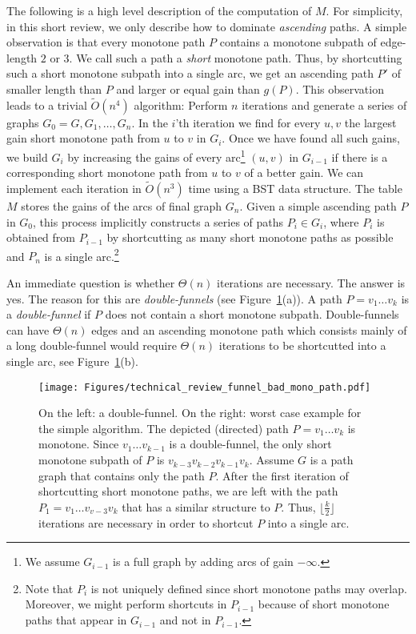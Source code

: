 \documentclass[11pt]{article}
\begin{document}
The following is a high level description of the computation of $M$. For simplicity, in this short review, we only describe how to dominate \emph{ascending} paths. A simple observation is that every monotone path $P$ contains a monotone subpath of edge-length $2$ or $3$. We call such a path a \emph{short} monotone path. Thus, by shortcutting such a short monotone subpath into a single arc, we get an ascending path $P'$ of smaller length than $P$ and larger or equal gain than $g(P)$. This observation leads to a trivial $\tilde{O}(n^4)$ algorithm: Perform $n$ iterations and generate a series of graphs $G_0=G,G_1,\ldots, G_n$. In the $i$'th iteration we find for every $u,v$ the largest gain short monotone path from $u$ to $v$ in $G_i$. Once we have found all such gains, we build $G_i$ by increasing the gains of every arc\footnote{We assume $G_{i-1}$ is a full graph by adding arcs of gain $-\infty$.} 
$(u,v)$
in $G_{i-1}$ if there is a corresponding short monotone path from $u$ to $v$ of a better gain. We can implement each iteration in $\tilde{O}(n^3)$ time using a BST data structure. The table $M$ stores the gains of the arcs of final graph $G_n$.
Given a simple ascending path $P$ in $G_0$, this process implicitly constructs a series of paths $P_i \in G_i$, where $P_i$ is obtained from $P_{i-1}$ by shortcutting as many short monotone paths as possible and $P_n$ is a single arc.\footnote{Note that $P_i$ is not uniquely defined since short monotone paths may overlap. Moreover, we might perform shortcuts in $P_{i-1}$ because of short monotone paths that appear in $G_{i-1}$ and not in $P_{i-1}$.}

An immediate question is whether $\Theta(n)$ iterations are necessary. The answer is yes. The reason for this are \emph{double-funnels} (see Figure~\ref{fig:double-funnel_mono}(a)). A path $P = v_1 \ldots v_k$ is a \emph{double-funnel} if $P$ does not contain a short monotone subpath.
Double-funnels can have $\Theta(n)$ edges and an ascending monotone path which consists mainly of a long double-funnel would require $\Theta(n)$ iterations to be shortcutted into a single arc, see Figure~\ref{fig:double-funnel_mono}(b).


\begin{figure}
    \centering
    \texttt{[image: Figures/technical\_review\_funnel\_bad\_mono\_path.pdf]}
    \caption{On the left: a double-funnel. On the right: worst case example for the simple algorithm. The depicted (directed) path $P=v_1\ldots v_k$ is monotone. Since $v_1\ldots v_{k-1}$ is a double-funnel, the only short monotone subpath of $P$ is $v_{k-3} v_{k-2} v_{k-1} v_{k}$. Assume $G$ is a path graph that contains only the path $P$. After the first iteration of shortcutting short monotone paths, we are left with the path $P_1 = v_1\ldots v_{v-3} v_k$ that has a similar structure to $P$. Thus, $\lfloor \frac{k}{2} \rfloor$ iterations are necessary in order to shortcut $P$ into a single arc.}
    \label{fig:double-funnel_mono}
\end{figure}
\end{document}
